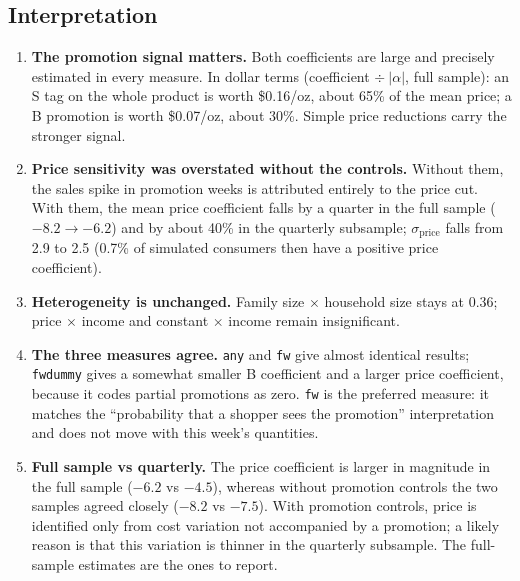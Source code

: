 \documentclass[11pt]{article}
\newcommand{\code}[1]{\texttt{#1}}
\newcommand{\sigprice}{\sigma_{\text{price}}}
\begin{document}
\subsection{Interpretation}\label{sec:promo-interp}

\begin{enumerate}
  \item \textbf{The promotion signal matters.} Both coefficients are large and precisely
        estimated in every measure. In dollar terms (coefficient $\div\ |\alpha|$, full
        sample): an S tag on the whole product is worth \$0.16/oz, about 65\% of the mean
        price; a B promotion is worth \$0.07/oz, about 30\%. Simple price reductions carry the
        stronger signal.
  \item \textbf{Price sensitivity was overstated without the controls.} Without them, the
        sales spike in promotion weeks is attributed entirely to the price cut. With them, the
        mean price coefficient falls by a quarter in the full sample ($-8.2 \to -6.2$) and by
        about 40\% in the quarterly subsample; $\sigprice$ falls from 2.9 to 2.5 (0.7\% of
        simulated consumers then have a positive price coefficient).
  \item \textbf{Heterogeneity is unchanged.} Family size $\times$ household size stays at
        0.36; price $\times$ income and constant $\times$ income remain insignificant.
  \item \textbf{The three measures agree.} \code{any} and \code{fw} give almost identical
        results; \code{fwdummy} gives a somewhat smaller B coefficient and a larger price
        coefficient, because it codes partial promotions as zero. \code{fw} is the preferred
        measure: it matches the ``probability that a shopper sees the promotion''
        interpretation and does not move with this week's quantities.
  \item \textbf{Full sample vs quarterly.} The price coefficient is larger in magnitude in the
        full sample ($-6.2$ vs $-4.5$), whereas without promotion controls the two samples
        agreed closely ($-8.2$ vs $-7.5$). With promotion controls, price is identified only
        from cost variation not accompanied by a promotion; a likely reason is that this
        variation is thinner in the quarterly subsample. The full-sample estimates are the
        ones to report.
\end{enumerate}
\end{document}

